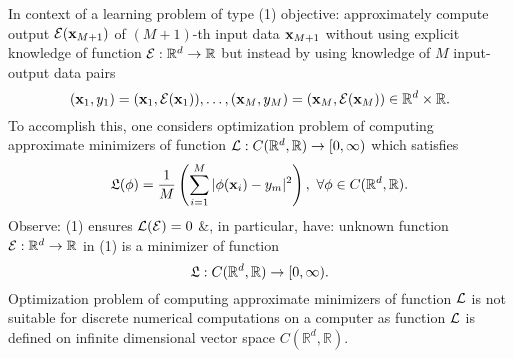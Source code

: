 \documentclass{article}
\begin{document}
In context of a learning problem of type (1) objective: approximately compute output ${\cal E}({\bf x}_{M+1})$ of $(M + 1)$-th input data ${\bf x}_{M+1}$ without using explicit knowledge of function ${\cal E}:\mathbb{R}^d\to\mathbb{R}$ but instead by using knowledge of $M$ input-output data pairs
\begin{equation}
	({\bf x}_1,y_1) = ({\bf x}_1,{\cal E}({\bf x}_1)),\ldots,({\bf x}_M,y_M) = ({\bf x}_M,{\cal E}({\bf x}_M))\in\mathbb{R}^d\times\mathbb{R}.
\end{equation}
To accomplish this, one considers optimization problem of computing approximate minimizers of function ${\cal L}:C(\mathbb{R}^d,\mathbb{R})\to[0,\infty)$ which satisfies
\begin{equation}
	{\frak L}(\phi) = \frac{1}{M}\left(\sum_{i=1}^M |\phi({\bf x}_i) - y_m|^2\right),\ \forall\phi\in C(\mathbb{R}^d,\mathbb{R}).
\end{equation}
Observe: (1) ensures ${\cal L}({\cal E}) = 0$ \&, in particular, have: unknown function ${\cal E}:\mathbb{R}^d\to\mathbb{R}$ in (1) is a minimizer of function
\begin{equation}
	{\frak L}:C(\mathbb{R}^d,\mathbb{R})\to[0,\infty).
\end{equation}
Optimization problem of computing approximate minimizers of function ${\cal L}$ is not suitable for discrete numerical computations on a computer as function ${\cal L}$ is defined on infinite dimensional vector space $C(\mathbb{R}^d,\mathbb{R})$.
\end{document}
